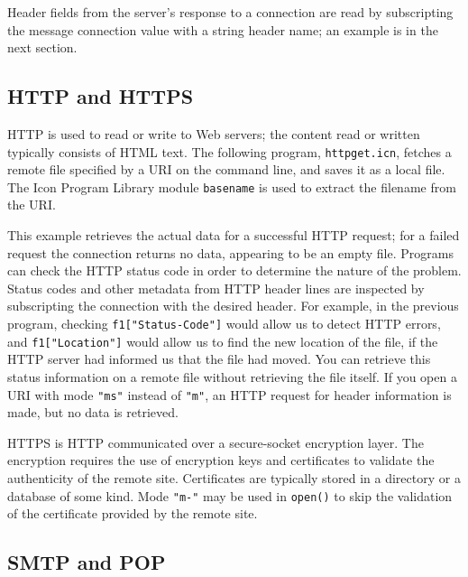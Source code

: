 Header fields from the server's response to a
connection are read by subscripting the message connection value
with a string header name; an example is in the next section.

\subsection*{HTTP and HTTPS}

HTTP is used to read or write to Web servers; the content
read or written typically consists of HTML text. The
following program, \texttt{httpget.icn}, fetches a remote file
specified by a URI on the command line, and saves it as a local file.
The Icon Program Library module \texttt{basename} is used to extract
the filename from the URI.



This example retrieves the actual data for a successful HTTP request;
for a failed request the connection returns no data, appearing to be an
empty file. Programs can check the HTTP status code in order to
determine the nature of the problem. Status codes and other metadata
from HTTP header lines are inspected by subscripting the connection
with the desired header. For example, in the previous program, checking
\texttt{f1["Status-Code"]} would allow us
to detect HTTP errors, and
\texttt{f1["Location"]} would allow us to
find the new location of the file, if the HTTP server had informed us
that the file had moved. You can retrieve this status information on a
remote file without retrieving the file itself. If you open a URI with
mode \texttt{"ms"} instead of
\texttt{"m"}, an HTTP request for header
information is made, but no data is retrieved.

HTTPS is HTTP communicated over a secure-socket
encryption layer. The encryption requires the use of encryption keys
and certificates to validate the authenticity of the remote site.
Certificates are typically stored in a directory or a
database of some kind. Mode \texttt{"m-"} may be used in
\texttt{open()} to skip the validation of the certificate provided
by the remote site.

\subsection*{SMTP and POP}

